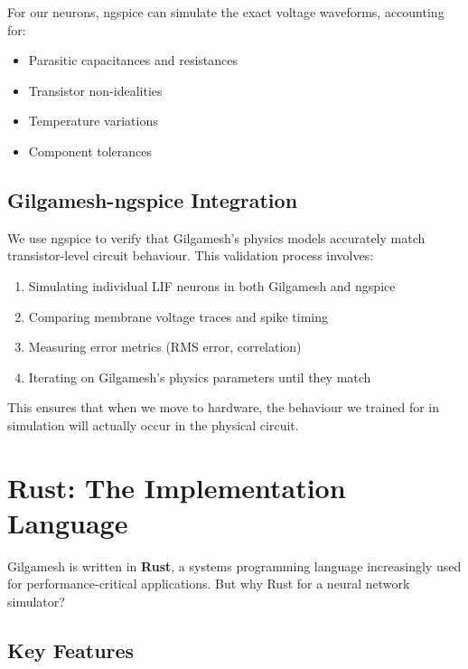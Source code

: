 \documentclass[11pt,a4paper]{article}
\begin{document}
For our neurons, ngspice can simulate the exact voltage waveforms, accounting for:
\begin{itemize}
    \item Parasitic capacitances and resistances
    \item Transistor non-idealities
    \item Temperature variations
    \item Component tolerances
\end{itemize}

\subsection{Gilgamesh-ngspice Integration}

We use ngspice to verify that Gilgamesh's physics models accurately match transistor-level circuit behaviour. This validation process involves:
\begin{enumerate}
    \item Simulating individual LIF neurons in both Gilgamesh and ngspice
    \item Comparing membrane voltage traces and spike timing
    \item Measuring error metrics (RMS error, correlation)
    \item Iterating on Gilgamesh's physics parameters until they match
\end{enumerate}

This ensures that when we move to hardware, the behaviour we trained for in simulation will actually occur in the physical circuit.

\section{Rust: The Implementation Language}

Gilgamesh is written in \textbf{Rust}, a systems programming language increasingly used for performance-critical applications. But why Rust for a neural network simulator?

\subsection{Key Features}
\end{document}

